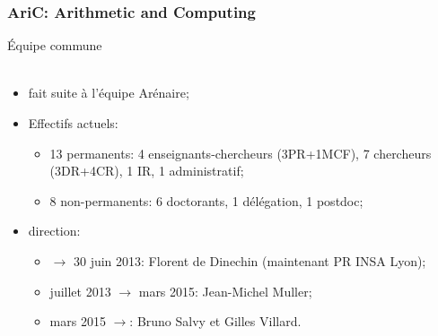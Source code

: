 \documentclass[mathsans]{beamer}
\begin{document}
\begin{frame}
\frametitle{AriC: Arithmetic and Computing}
Équipe commune\\[-0.65cm] \\[0.5cm]
\begin{itemize}
    \item fait suite à l'équipe Arénaire;
    \item Effectifs actuels:
    \begin{itemize}
          \item \alert{13 permanents:} 4 enseignants-chercheurs (3PR+1MCF), 7 chercheurs (3DR+4CR), 1 IR, 1 administratif;
         \item \alert{8 non-permanents:} 6 doctorants, 1 délégation, 1 postdoc;
      \end{itemize}   
    \item direction:
    \begin{itemize}
          \item $\longrightarrow$  30 juin 2013: Florent de Dinechin (maintenant PR INSA Lyon);
          \item juillet 2013 $\longrightarrow$ mars 2015: Jean-Michel Muller;
          \item mars 2015 $\longrightarrow$: Bruno Salvy et Gilles Villard.
     \end{itemize}
\end{itemize}
\end{frame}
\end{document}
